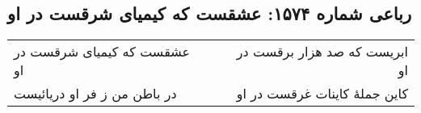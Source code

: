 \begin{center}
\section*{رباعی شماره ۱۵۷۴: عشقست که کیمیای شرقست در او}
\label{sec:1574}
\begin{longtable}{l p{0.5cm} r}
عشقست که کیمیای شرقست در او
&&
ابریست که صد هزار برقست در او
\\
در باطن من ز فر او دریائیست
&&
کاین جملهٔ کاینات غرقست در او
\\
\end{longtable}
\end{center}
